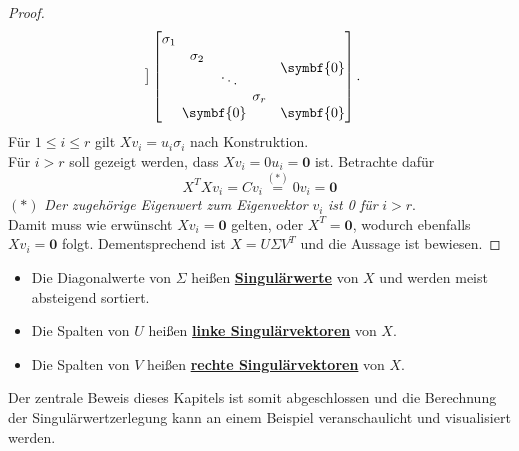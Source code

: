 \begin{proof}
\begin{equation*}
\begin{matrix}
        \end{matrix}
        \big]
        \begin{bmatrix}
            \begin{matrix}
                \sigma_1 &  &  &  \\
                & \sigma_2 &  & \\
                &  &  \raisebox{-0.9ex}{\rotatebox{13}{\(\ddots\)}} &  \\
                &  &  & \sigma_r
            \end{matrix} & \symbf{0} \\
            \symbf{0} & \symbf{0}
        \end{bmatrix}.
    \end{equation*}
    Für \(1 \leq i \leq r\) gilt \(Xv_i = u_i \sigma_i\) nach Konstruktion. \\
    Für \(i > r\) soll gezeigt werden, dass \(Xv_i = 0u_i  = \symbf{0}\) ist. 
    Betrachte dafür
    \begin{equation*}
        X^{T}Xv_i = Cv_i \overset{(*)}{=} 0v_i = \symbf{0}
    \end{equation*}
    {\small\((*)\) \textit{Der zugehörige Eigenwert zum Eigenvektor} \(v_i\) \textit{ist \num{0} für} \(i>r\).} 
    \vspace{5pt}
    \\
    Damit muss wie erwünscht \(Xv_i = \symbf{0}\) gelten, oder \(X^{T} = \symbf{0}\), wodurch ebenfalls \(Xv_i = \symbf{0}\) folgt.       
    Dementsprechend ist \(X = U \Sigma V^{T}\) und die Aussage ist bewiesen. 
\end{proof}
\begin{remark}\leavevmode
    \vspace{-14pt}
    \begin{itemize}
        \item Die Diagonalwerte von \(\Sigma\) heißen \textbf{\underline{Singulärwerte}} von \(X\) und werden meist absteigend sortiert. 
        \item Die Spalten von \(U\) heißen \textbf{\underline{linke Singulärvektoren}} von \(X\).
        \item Die Spalten von \(V\) heißen \textbf{\underline{rechte Singulärvektoren}} von \(X\). 
    \end{itemize}       
\end{remark}
Der zentrale Beweis dieses Kapitels ist somit abgeschlossen und die Berechnung der Singulärwertzerlegung kann an einem Beispiel veranschaulicht und visualisiert werden.
